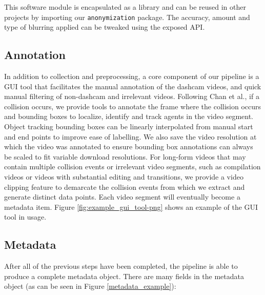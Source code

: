 \documentclass[letterpaper, 10 pt, conference]{ieeeconf}
\begin{document}
This software module is encapsulated as a library and can be reused in other projects by importing our \texttt{anonymization} package. The accuracy, amount and type of blurring applied can be tweaked using the exposed API.

\subsection{Annotation}

In addition to collection and preprocessing, a core component of our pipeline is a GUI tool that facilitates the manual annotation of the dashcam videos, and quick manual filtering of non-dashcam and irrelevant videos. Following Chan et al.\cite{chan2016anticipating}, if a collision occurs, we provide tools to annotate the frame where the collision occurs and bounding boxes to localize, identify and track agents in the video segment. Object tracking bounding boxes can be linearly interpolated from manual start and end points to improve ease of labelling. We also save the video resolution at which the video was annotated to ensure bounding box annotations can always be scaled to fit variable download resolutions. For long-form videos that may contain multiple collision events or irrelevant video segments, such as compilation videos or videos with substantial editing and transitions, we provide a video clipping feature to demarcate the collision events from which we extract and generate distinct data points. 
Each video segment will eventually become a metadata item. Figure \ref{fig:example_gui_tool-png} shows an example of the GUI tool in usage.

\subsection{Metadata}
After all of the previous steps have been completed, the pipeline is able to produce a complete metadata object.
There are many fields in the metadata object (as can be seen in Figure \ref{metadata_example}):
\end{document}
